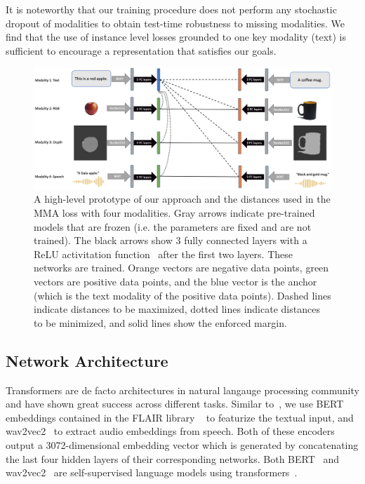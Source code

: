 \documentclass[sigconf,natbib=true,anonymous=true]{acmart}
\begin{document}
It is noteworthy that our training procedure does not perform any stochastic dropout of modalities to obtain test-time robustness to missing modalities. We find that the use of instance level losses grounded to one key modality (text) is sufficient to encourage a representation that satisfies our goals. 

\begin{figure}[tb]
\centering
\includegraphics[width=2.1\columnwidth]{Figures/e-MMA.png}
\caption{A high-level prototype of our approach and the distances used in the MMA loss with four modalities. Gray arrows indicate pre-trained models that are frozen (i.e. the parameters are fixed and are not trained). The black arrows show 3 fully connected layers with a ReLU activitation function~\cite{relu2010} after the first two layers. These networks are trained.
Orange vectors are negative data points, green vectors are positive data points, and the blue vector is the anchor (which is the text modality of the positive data points).
Dashed lines indicate distances to be maximized, dotted lines indicate distances to be minimized, and solid lines show the enforced margin.
}
\label{fig:emma-loss}
\end{figure}


\subsection{Network Architecture}
\label{sec:Model}

Transformers are de facto architectures in natural langauge processing community and have shown great success across different tasks. Similar to~\citet{GoLD_UMBC}, we use BERT~\cite{devlin-etal-2019-bert} embeddings contained in the FLAIR library ~\cite{akbik2019flair,akbik-etal-2019-pooled} to featurize the textual input, and wav2vec2~\cite{wav2vec2} to extract audio embeddings from speech. Both of these encoders output a 3072-dimensional embedding vector which is generated by concatenating the last four hidden layers of their corresponding networks. Both BERT~\cite{devlin-etal-2019-bert} and wav2vec2~\cite{wav2vec2} are self-supervised language models using transformers~\cite{vaswani2017attention}.
\end{document}
